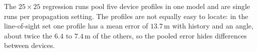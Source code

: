 The $25\times25$ regression runs pool five device profiles in one model and are single runs per propagation setting. The profiles are not equally easy to locate: in the line-of-sight set one profile has a mean error of $13.7\,\text{m}$ with history and an angle, about twice the $6.4$ to $7.4\,\text{m}$ of the others, so the pooled error hides differences between devices.
